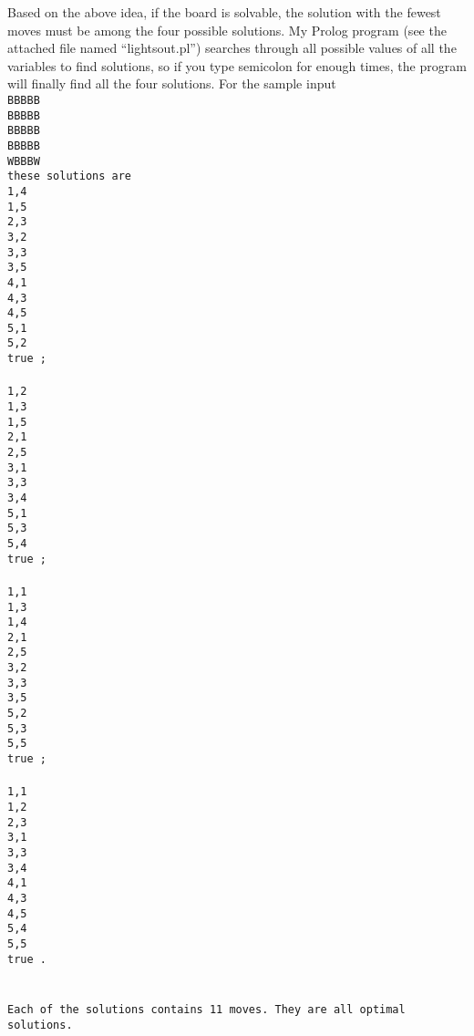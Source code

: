 \documentclass[12pt,letterpaper]{article}
\begin{document}
Based on the above idea, if the board is solvable, the solution with the fewest moves must be among the four possible solutions. My Prolog program (see the attached file named ``lightsout.pl'') searches through all possible values of all the variables to find solutions, so if you type semicolon for enough times, the program will finally find all the four solutions. For the sample input
\tt\\
BBBBB\\
BBBBB\\
BBBBB\\
BBBBB\\
WBBBW
\rm\\
these solutions are
\tt\\
1,4\\
1,5\\
2,3\\
3,2\\
3,3\\
3,5\\
4,1\\
4,3\\
4,5\\
5,1\\
5,2\\
true ;\\
\\
1,2\\
1,3\\
1,5\\
2,1\\
2,5\\
3,1\\
3,3\\
3,4\\
5,1\\
5,3\\
5,4\\
true ;\\
\\
1,1\\
1,3\\
1,4\\
2,1\\
2,5\\
3,2\\
3,3\\
3,5\\
5,2\\
5,3\\
5,5\\
true ;\\
\\
1,1\\
1,2\\
2,3\\
3,1\\
3,3\\
3,4\\
4,1\\
4,3\\
4,5\\
5,4\\
5,5\\
true .\\
\rm\\
\\
Each of the solutions contains 11 moves. They are all optimal solutions.
\end{document}
